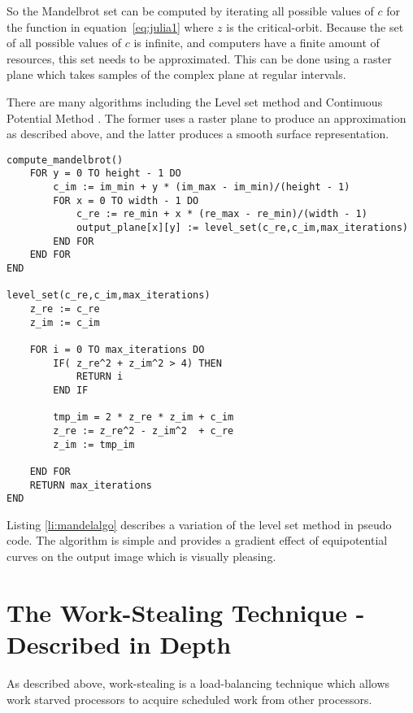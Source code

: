 So the Mandelbrot set can be computed by iterating all possible values of \(c\) for the function in equation~\ref{eq:julia1} where \(z\) is the 
\gls{critical-orbit}. Because the set of all possible values of \(c\) is infinite, and computers have a finite amount of resources, this 
set needs to be approximated. This can be done using a raster plane which takes samples of the complex plane at regular intervals. 

There are many algorithms including the Level set method \cite[p.~188]{fractimg} and Continuous Potential Method \cite[p.~191]{fractimg}.
The former uses a raster plane to produce an approximation as described above, and the latter produces a smooth surface representation.
\\

\begin{lstlisting}[label = li:mandelalgo, caption = A sequential algorithm to compute the Mandelbrot Set]
compute_mandelbrot()
    FOR y = 0 TO height - 1 DO
        c_im := im_min + y * (im_max - im_min)/(height - 1)
        FOR x = 0 TO width - 1 DO
            c_re := re_min + x * (re_max - re_min)/(width - 1)
            output_plane[x][y] := level_set(c_re,c_im,max_iterations)
        END FOR
    END FOR
END

level_set(c_re,c_im,max_iterations)
    z_re := c_re
    z_im := c_im

    FOR i = 0 TO max_iterations DO
        IF( z_re^2 + z_im^2 > 4) THEN
            RETURN i
        END IF
        
        tmp_im = 2 * z_re * z_im + c_im
        z_re := z_re^2 - z_im^2  + c_re
        z_im := tmp_im
        
    END FOR
    RETURN max_iterations
END
\end{lstlisting}

Listing \ref{li:mandelalgo} describes a variation of the level set method in pseudo code. 
The algorithm is simple and provides a gradient effect of equipotential curves on the output image
which is visually pleasing.

\section{The Work-Stealing Technique - Described in Depth}
\label{sec:resworkdepth}

As described above, \gls{work-stealing} is a \gls{load-balancing} technique which allows work starved processors to acquire scheduled work from other processors. 

